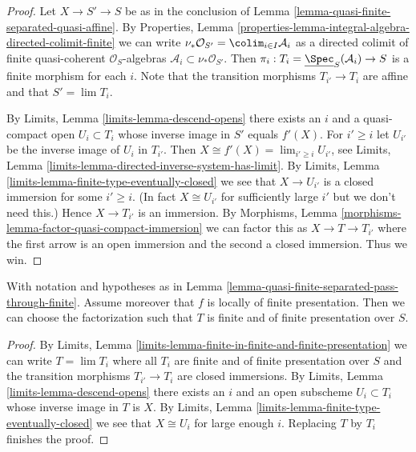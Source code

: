 \begin{proof}
Let $X \to S' \to S$ be as in the conclusion of
Lemma \ref{lemma-quasi-finite-separated-quasi-affine}.
By
Properties, Lemma
\ref{properties-lemma-integral-algebra-directed-colimit-finite}
we can write
$\nu_*\mathcal{O}_{S'} = \colim_{i \in I} \mathcal{A}_i$ as a
directed colimit of finite quasi-coherent $\mathcal{O}_S$-algebras
$\mathcal{A}_i \subset \nu_*\mathcal{O}_{S'}$. Then
$\pi_i : T_i = \underline{\Spec}_S(\mathcal{A}_i) \to S$
is a finite morphism for each $i$.
Note that the transition morphisms $T_{i'} \to T_i$ are affine
and that $S' = \lim T_i$.

\medskip\noindent
By Limits, Lemma \ref{limits-lemma-descend-opens}
there exists an $i$ and a quasi-compact open
$U_i \subset T_i$ whose inverse image in $S'$ equals
$f'(X)$. For $i' \geq i$ let $U_{i'}$ be the inverse image
of $U_i$ in $T_{i'}$. Then $X \cong f'(X) = \lim_{i' \geq i} U_{i'}$, see
Limits, Lemma \ref{limits-lemma-directed-inverse-system-has-limit}.
By Limits, Lemma \ref{limits-lemma-finite-type-eventually-closed} we see that
$X \to U_{i'}$ is a closed immersion for some $i' \geq i$.
(In fact $X \cong U_{i'}$ for sufficiently
large $i'$ but we don't need this.) Hence $X \to T_{i'}$ is an immersion. By
Morphisms, Lemma \ref{morphisms-lemma-factor-quasi-compact-immersion}
we can factor this as $X \to T \to T_{i'}$ where the first arrow
is an open immersion and the second a closed immersion. Thus we win.
\end{proof}

\begin{lemma}
\label{lemma-quasi-finite-separated-pass-through-finite-addendum}
With notation and hypotheses as in
Lemma \ref{lemma-quasi-finite-separated-pass-through-finite}.
Assume moreover that $f$ is locally of finite presentation. Then we can
choose the factorization such that $T$ is finite and of
finite presentation over $S$.
\end{lemma}

\begin{proof}
By Limits, Lemma
\ref{limits-lemma-finite-in-finite-and-finite-presentation} we can write
$T = \lim T_i$ where all $T_i$ are finite and of finite presentation
over $S$ and the transition morphisms $T_{i'} \to T_i$ are closed
immersions. By
Limits, Lemma \ref{limits-lemma-descend-opens}
there exists an $i$ and an open subscheme $U_i \subset T_i$ whose inverse
image in $T$ is $X$. By
Limits, Lemma
\ref{limits-lemma-finite-type-eventually-closed}
we see that $X \cong U_i$ for large enough $i$.
Replacing $T$ by $T_i$ finishes the proof.
\end{proof}








